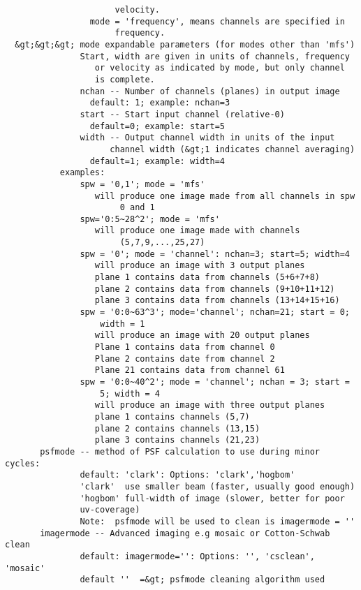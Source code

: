 \begin{verbatim}
                      velocity.
                 mode = 'frequency', means channels are specified in 
                      frequency.
  &gt;&gt;&gt; mode expandable parameters (for modes other than 'mfs')
               Start, width are given in units of channels, frequency 
                  or velocity as indicated by mode, but only channel
                  is complete.
               nchan -- Number of channels (planes) in output image
                 default: 1; example: nchan=3
               start -- Start input channel (relative-0)
                 default=0; example: start=5
               width -- Output channel width in units of the input
                     channel width (&gt;1 indicates channel averaging)
                 default=1; example: width=4
           examples:
               spw = '0,1'; mode = 'mfs'
                  will produce one image made from all channels in spw 
                       0 and 1
               spw='0:5~28^2'; mode = 'mfs'
                  will produce one image made with channels 
                       (5,7,9,...,25,27)
               spw = '0'; mode = 'channel': nchan=3; start=5; width=4
                  will produce an image with 3 output planes
                  plane 1 contains data from channels (5+6+7+8)
                  plane 2 contains data from channels (9+10+11+12)
                  plane 3 contains data from channels (13+14+15+16)
               spw = '0:0~63^3'; mode='channel'; nchan=21; start = 0; 
                   width = 1
                  will produce an image with 20 output planes
                  Plane 1 contains data from channel 0
                  Plane 2 contains date from channel 2
                  Plane 21 contains data from channel 61
               spw = '0:0~40^2'; mode = 'channel'; nchan = 3; start = 
                   5; width = 4
                  will produce an image with three output planes
                  plane 1 contains channels (5,7)
                  plane 2 contains channels (13,15)
                  plane 3 contains channels (21,23)
       psfmode -- method of PSF calculation to use during minor cycles:
               default: 'clark': Options: 'clark','hogbom'
               'clark'  use smaller beam (faster, usually good enough)
               'hogbom' full-width of image (slower, better for poor 
               uv-coverage)
               Note:  psfmode will be used to clean is imagermode = ''
       imagermode -- Advanced imaging e.g mosaic or Cotton-Schwab clean
               default: imagermode='': Options: '', 'csclean', 'mosaic'
               default ''  =&gt; psfmode cleaning algorithm used

\end{verbatim}
